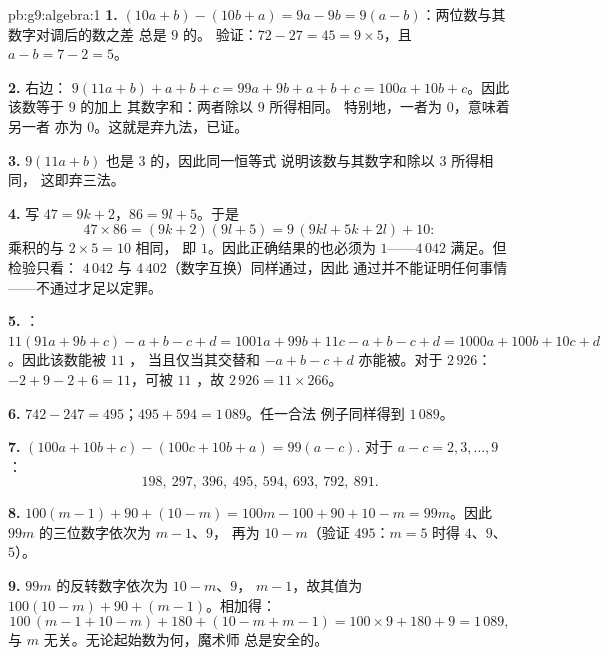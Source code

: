 \begin{solution}{pb:g9:algebra:1}
\textbf{1.} $(10a + b) - (10b + a) = 9a - 9b = 9(a - b)$：两位数与其数字对调后的数之差
总是 $9$ 的。
验证：$72 - 27 = 45 = 9 \times 5$，且
$a - b = 7 - 2 = 5$。

\textbf{2.} 右边：
$9(11a + b) + a + b + c = 99a + 9b + a + b + c
= 100a + 10b + c$。因此该数等于 $9$ 的加上
其数字和：两者除以 $9$ 所得相同。
特别地，一者为 $0$，意味着另一者
亦为 $0$。这就是弃九法，已证。

\textbf{3.} $9(11a + b)$ 也是 $3$ 的，因此同一恒等式
说明该数与其数字和除以 $3$ 所得相同，
这即弃三法。

\textbf{4.} 写 $47 = 9k + 2$，$86 = 9l + 5$。于是
\[
47 \times 86 = (9k + 2)(9l + 5)
= 9\,(9kl + 5k + 2l) + 10 :
\]
乘积的与 $2 \times 5 = 10$ 相同，
即 $1$。因此正确结果的也必须为
$1$——$4\,042$ 满足。但检验只看：
$4\,042$ 与 $4\,402$（数字互换）同样通过，因此
通过并不能证明任何事情——不通过才足以定罪。

\textbf{5.} ：$11(91a + 9b + c) - a + b - c + d
= 1001a + 99b + 11c - a + b - c + d
= 1000a + 100b + 10c + d$。因此该数能被 $11$ ，
当且仅当其交替和 $-a + b - c + d$ 亦能被。对于
$2\,926$：$-2 + 9 - 2 + 6 = 11$，可被 $11$ ，故
$2\,926 = 11 \times 266$。

\textbf{6.} $742 - 247 = 495$；$495 + 594 = 1\,089$。任一合法
例子同样得到 $1\,089$。

\textbf{7.} $(100a + 10b + c) - (100c + 10b + a) = 99(a - c)$.
对于 $a - c = 2, 3, \dots, 9$：
\[
198,\ 297,\ 396,\ 495,\ 594,\ 693,\ 792,\ 891 .
\]

\textbf{8.} $100(m - 1) + 90 + (10 - m) = 100m - 100 + 90 + 10
- m = 99m$。因此 $99m$ 的三位数字依次为 $m - 1$、$9$，
再为 $10 - m$（验证 $495$：$m = 5$ 时得 $4$、$9$、$5$）。

\textbf{9.} $99m$ 的反转数字依次为 $10 - m$、$9$，
$m - 1$，故其值为 $100(10 - m) + 90 + (m - 1)$。相加得：
\[
100\,(m - 1 + 10 - m) + 180 + (10 - m + m - 1)
= 100 \times 9 + 180 + 9 = 1\,089 ,
\]
与 $m$ 无关。无论起始数为何，魔术师
总是安全的。


\end{solution}

